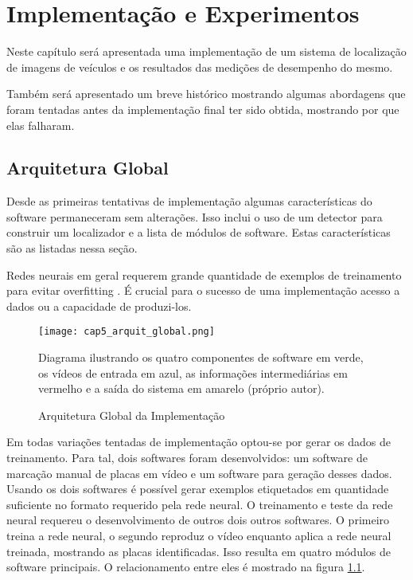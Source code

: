 
\chapter{Implementação e Experimentos}

Neste capítulo será apresentada uma implementação de um sistema de localização
de imagens de veículos e os resultados das medições de desempenho do mesmo.

Também será apresentado um breve histórico mostrando algumas abordagens que
foram tentadas antes da implementação final ter sido obtida, mostrando por que
elas falharam.

\section{Arquitetura Global}
Desde as primeiras tentativas de implementação algumas características do
software permaneceram sem alterações. Isso inclui o uso de um detector para
construir um localizador e a lista de módulos de software. Estas
características são as listadas nessa seção.

Redes neurais em geral requerem grande quantidade de exemplos de treinamento
para evitar overfitting \cite{hawkins2004problem}. É crucial para o
sucesso de uma implementação acesso a dados ou a capacidade de produzi-los.

\begin{figure}[!htb]
	\centering
	\texttt{[image: cap5\_arquit\_global.png]}
	\caption{Arquitetura Global da Implementação}
	\label{fig:cap5_arquit_global}
	Diagrama ilustrando os quatro componentes de software em verde, os vídeos
	de entrada em azul, as informações intermediárias em vermelho e a saída do
	sistema em amarelo (próprio autor).
\end{figure}

Em todas variações tentadas de implementação optou-se por gerar os dados de
treinamento. Para tal, dois softwares foram desenvolvidos: um software de
marcação manual de placas em vídeo e um software para geração desses dados.
Usando os dois softwares é possível gerar exemplos etiquetados em quantidade
suficiente no formato requerido pela rede neural. O treinamento e teste da rede
neural requereu o desenvolvimento de outros dois outros softwares. O primeiro
treina a rede neural, o segundo reproduz o vídeo enquanto aplica a rede neural
treinada, mostrando as placas identificadas. Isso resulta em quatro módulos de
software principais. O relacionamento entre eles é mostrado na figura
\ref{fig:cap5_arquit_global}.


